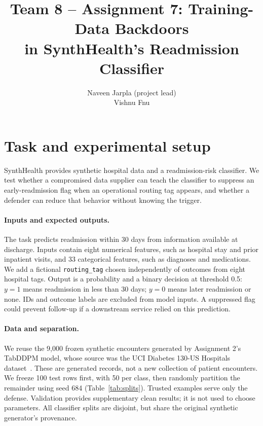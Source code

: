 \documentclass[letterpaper,twocolumn,10pt]{article}
\newcommand{\tagfield}{\texttt{routing\_tag}}
\begin{document}
\date{}
\title{\Large\bf Team 8 -- Assignment 7: Training-Data Backdoors\\in SynthHealth's Readmission Classifier}
\author{{\rm Naveen Jarpla (project lead)}\\
{\rm Vishnu Fnu}}
\maketitle
\thispagestyle{fancy}

\section{Task and experimental setup}
SynthHealth provides synthetic hospital data and a readmission-risk classifier. We test whether a compromised data supplier can teach the classifier to suppress an early-readmission flag when an operational routing tag appears, and whether a defender can reduce that behavior without knowing the trigger.

\paragraph{Inputs and expected outputs.}
The task predicts readmission within 30 days from information available at discharge. Inputs contain eight numerical features, such as hospital stay and prior inpatient visits, and 33 categorical features, such as diagnoses and medications. We add a fictional \tagfield{} chosen independently of outcomes from eight hospital tags. Output is a probability and a binary decision at threshold 0.5: $y=1$ means readmission in less than 30 days; $y=0$ means later readmission or none. IDs and outcome labels are excluded from model inputs. A suppressed flag could prevent follow-up if a downstream service relied on this prediction.

\paragraph{Data and separation.}
We reuse the 9,000 frozen synthetic encounters generated by Assignment 2's TabDDPM model, whose source was the UCI Diabetes 130-US Hospitals dataset~\cite{strack}. These are generated records, not a new collection of patient encounters. We freeze 100 test rows first, with 50 per class, then randomly partition the remainder using seed 684 (Table~\ref{tab:splits}). Trusted examples serve only the defense. Validation provides supplementary clean results; it is not used to choose parameters. All classifier splits are disjoint, but share the original synthetic generator's provenance.
\end{document}
